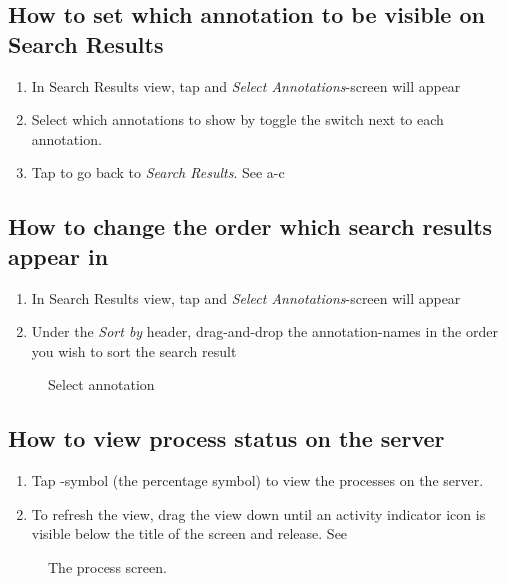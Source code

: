 \subsection{How to set which annotation to be visible on Search Results}

\begin{enumerate}
\item In Search Results view, tap  and \emph{Select Annotations}-screen will appear
\item Select which annotations to show by toggle the switch next to each annotation.
\item Tap  to go back to \emph{Search Results}. See a-c
\end{enumerate}

\subsection{How to change the order which search results appear in}

\begin{enumerate}
\item In Search Results view, tap  and \emph{Select Annotations}-screen will appear
\item Under the \emph{Sort by} header, drag-and-drop the annotation-names in the order you wish to sort the search result
\end{enumerate}

\begin{figure}[ht]
\caption{Select annotation}
\label{fig:ios_searchResult}
\end{figure}
\FloatBarrier

\subsection{How to view process status on the server}

\begin{enumerate}
\item Tap -symbol (the percentage symbol) to view the processes on the server.
\item To refresh the view, drag the view down until an activity indicator icon is visible below the title of the screen and release. See 
\end{enumerate}

\begin{figure}[htb]
\caption{The process screen.}
\label{fig:ios_processes}
\end{figure}
\FloatBarrier

